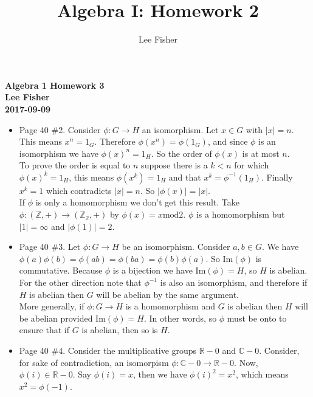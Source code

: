 \documentclass[12pt]{report}
\title{\textbf{Algebra I: Homework 2}}
\author{Lee Fisher}
\date{}
\begin{document}
\textbf{Algebra 1 Homework 3}\\
\indent \textbf{Lee Fisher}\\
\indent \textbf{2017-09-09}

\begin{itemize}

\item Page 40 \#2. Consider $\phi: G \to H$ an isomorphism. Let $x \in G$ with
      $|x| = n$. This means $x^n=1_G$. Therefore $\phi(x^n) = \phi(1_G)$, and
      since $\phi$ is an isomorphism we have $\phi(x)^n = 1_H$. So the order of
      $\phi(x)$ is at most $n$.\\

      To prove the order is equal to $n$ suppose there is a $k<n$ for which
      $\phi(x)^k = 1_H$, this means $\phi(x^k) = 1_H$ and that $x^k =
      \phi^{-1}(1_H)$. Finally $x^k = 1$ which contradicts $|x|=n$. So
      $|\phi(x)| = |x|$.\\

      If $\phi$ is only a homomorphism we don't get this result. Take
      $\phi:(\mathbb{Z},+) \to (\mathbb{Z_2},+)$ by $\phi(x) = x \textrm{mod}2$.
      $\phi$ is a homomorphism but $|1| = \infty$ and $|\phi(1)| = 2$.\\

\item Page 40 \#3. Let $\phi: G \to H$ be an isomorphism. Consider $a,b \in G$.
      We have $\phi(a)\phi(b) = \phi(ab) = \phi(ba) = \phi(b)\phi(a)$. So
      $\textrm{Im}(\phi)$ is commutative. Because $\phi$ is a bijection we have
      $\textrm{Im}(\phi) = H$, so $H$ is abelian.\\

      For the other direction note that $\phi^{-1}$ is also an isomorphism, and
      therefore if $H$ is abelian then $G$ will be abelian by the same argument.\\

      More generally, if $\phi:G \to H$ is a homomorphism and $G$ is abelian
      then $H$ will be abelian provided $\textrm{Im}(\phi) = H$. In other words,
      so $\phi$ must be onto to ensure that if $G$ is abelian, then so is $H$.\\

\item Page 40 \#4. Consider the multiplicative groups $\mathbb{R}-{0}$ and
      $\mathbb{C}-{0}$. Consider, for sake of contradiction, an isomorpism
      $\phi: \mathbb{C}-{0} \to \mathbb{R}-{0}$. Now, $\phi(i) \in
      \mathbb{R}-{0}$. Say $\phi(i) = x$, then we have $\phi(i)^2 = x^2$, which
      means $x^2 = \phi(-1)$.\\


\end{itemize}
\end{document}
